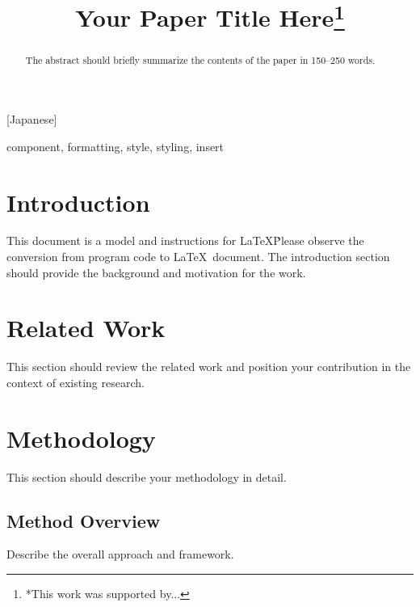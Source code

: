 [Japanese] \documentclass[conference,twocolumn]{IEEEtran}
\begin{document}
\title{Your Paper Title Here\thanks{*This work was supported by...}}

\author{
\and
{}
}

\maketitle

\begin{abstract}
The abstract should briefly summarize the contents of the paper in 150--250 words.
\end{abstract}

\begin{IEEEkeywords}
component, formatting, style, styling, insert
\end{IEEEkeywords}

\section{Introduction}
This document is a model and instructions for \LaTeX\. Please observe the
conversion from program code to \LaTeX\ document. The introduction section
should provide the background and motivation for the work.

\section{Related Work}
This section should review the related work and position your contribution
in the context of existing research.

\section{Methodology}
This section should describe your methodology in detail.

\subsection{Method Overview}
Describe the overall approach and framework.
\end{document}
